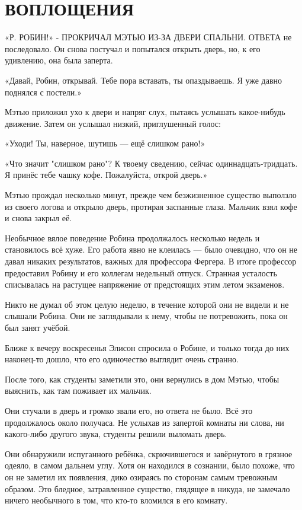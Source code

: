 \documentclass[a4paper,12pt]{book}
\begin{document}
\chapter{ВОПЛОЩЕНИЯ}
\noindent\par«Р{. РОБИН!» - ПРОКРИЧАЛ МЭТЬЮ ИЗ-ЗА ДВЕРИ СПАЛЬНИ. ОТВЕТА} не последовало. Он снова постучал и попытался открыть дверь, но, к его удивлению, она была заперта.
\par
«Давай, Робин, открывай. Тебе пора вставать, ты опаздываешь. Я уже давно поднялся с постели.»
\par
Мэтью приложил ухо к двери и напряг слух, пытаясь услышать какое-нибудь движение. Затем он услышал низкий, приглушенный голос:
\par
«Уходи! Ты, наверное, шутишь — ещё слишком рано!»
\par
«Что значит "слишком рано"? К твоему сведению, сейчас одиннадцать-тридцать. Я принёс тебе чашку кофе. Пожалуйста, открой дверь.»
\par
Мэтью прождал несколько минут, прежде чем безжизненное существо выползло из своего логова и открыло дверь, протирая заспанные глаза. Мальчик взял кофе и снова закрыл её.\\
\par
Необычное вялое поведение Робина продолжалось несколько недель и становилось всё хуже. Его работа явно не клеилась — было очевидно, что он не давал никаких результатов, важных для профессора Фергера. В итоге профессор предоставил Робину и его коллегам недельный отпуск. Странная усталость списывалась на растущее напряжение от предстоящих этим летом экзаменов.
\par
Никто не думал об этом целую неделю, в течение которой они не видели и не слышали Робина. Они не заглядывали к нему, чтобы не потревожить, пока он был занят учёбой.
\par
Ближе к вечеру воскресенья Элисон спросила о Робине, и только тогда до них наконец-то дошло, что его одиночество выглядит очень странно.
\par
После того, как студенты заметили это, они вернулись в дом Мэтью, чтобы выяснить, как там поживает их мальчик.
\par
Они стучали в дверь и громко звали его, но ответа не было. Всё это продолжалось около получаса. Не услыхав из запертой комнаты ни слова, ни какого-либо другого звука, студенты решили выломать дверь.
\par
Они обнаружили испуганного ребёнка, скрючившегося и завёрнутого в грязное одеяло, в самом дальнем углу. Хотя он находился в сознании, было похоже, что он не заметил их появления, дико озираясь по сторонам самым тревожным образом. Это бледное, затравленное существо, глядящее в никуда, не замечало ничего необычного в том, что кто-то вломился в его комнату.
\end{document}
